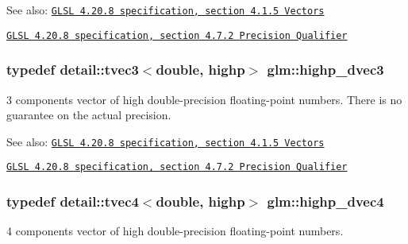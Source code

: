 \begin{Desc}
\item[See also:]\href{http://www.opengl.org/registry/doc/GLSLangSpec.4.20.8.pdf}{\tt GLSL 4.20.8 specification, section 4.1.5 Vectors} 

\href{http://www.opengl.org/registry/doc/GLSLangSpec.4.20.8.pdf}{\tt GLSL 4.20.8 specification, section 4.7.2 Precision Qualifier} \end{Desc}
\hypertarget{group__core__precision_g4962711854156dae8ebb4eb39237c542}{
\subsubsection[highp\_\-dvec3]{\setlength{\rightskip}{0pt plus 5cm}typedef detail::tvec3$<$double, highp$>$ {\bf glm::highp\_\-dvec3}}}
\label{group__core__precision_g4962711854156dae8ebb4eb39237c542}


3 components vector of high double-precision floating-point numbers. There is no guarantee on the actual precision.

\begin{Desc}
\item[See also:]\href{http://www.opengl.org/registry/doc/GLSLangSpec.4.20.8.pdf}{\tt GLSL 4.20.8 specification, section 4.1.5 Vectors} 

\href{http://www.opengl.org/registry/doc/GLSLangSpec.4.20.8.pdf}{\tt GLSL 4.20.8 specification, section 4.7.2 Precision Qualifier} \end{Desc}
\hypertarget{group__core__precision_gd5ff5ff4a69e6925f5b4f540e2633835}{
\subsubsection[highp\_\-dvec4]{\setlength{\rightskip}{0pt plus 5cm}typedef detail::tvec4$<$double, highp$>$ {\bf glm::highp\_\-dvec4}}}
\label{group__core__precision_gd5ff5ff4a69e6925f5b4f540e2633835}


4 components vector of high double-precision floating-point numbers.

